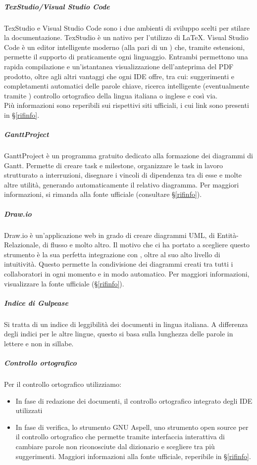 			\subparagraph{TexStudio/Visual Studio Code}
			TexStudio e Visual Studio Code sono i due ambienti di sviluppo scelti per stilare la documentazione.
			TexStudio è un  nativo per l'utilizzo di \LaTeX. Visual Studio Code è un editor intelligente moderno (alla pari di un ) che, tramite
			estensioni, permette il supporto di praticamente ogni linguaggio.
			Entrambi permettono una rapida compilazione e un'istantanea visualizzazione dell'anteprima del PDF prodotto, oltre agli altri vantaggi che ogni IDE offre,
			tra cui: suggerimenti e completamenti automatici delle parole chiave, ricerca intelligente (eventualmente tramite ) controllo ortografico della
			lingua italiana o inglese e così via.\\
			Più informazioni sono reperibili sui rispettivi siti ufficiali, i cui link sono presenti in \S\ref{rifinfo}.

			\subparagraph{GanttProject}
			GanttProject è un programma gratuito dedicato alla formazione dei diagrammi di Gantt. Permette di creare task e milestone, organizzare le task in lavoro
			strutturato a interruzioni, disegnare i vincoli di dipendenza tra di esse e molte altre utilità, generando automaticamente il relativo diagramma.
			Per maggiori informazioni, si rimanda alla fonte ufficiale (consultare \S\ref{rifinfo}).

			\subparagraph{Draw.io}\label{drawio}
			Draw.io è un'applicazione web in grado di creare diagrammi UML, di Entità-Relazionale, di flusso e molto altro. Il motivo che ci ha portato
			a scegliere questo strumento è la sua perfetta integrazione con , oltre al suo alto livello di intuitività.
			Questo permette la condivisione dei diagrammi creati tra tutti i collaboratori in ogni momento e in modo automatico.
			Per maggiori informazioni, visualizzare la fonte ufficiale (\S\ref{rifinfo}).

			\subparagraph{Indice di Gulpease}
			Si tratta di un indice di leggibilità dei documenti in lingua italiana. A differenza degli indici per le altre lingue, questo si basa sulla
			lunghezza delle parole in lettere e non in sillabe.

			\subparagraph{Controllo ortografico}
			Per il controllo ortografico utilizziamo:
			\begin{itemize}
				\item In fase di redazione dei documenti, il controllo ortografico integrato degli IDE utilizzati
				\item In fase di verifica, lo strumento GNU Aspell, uno strumento open source per il controllo ortografico che permette tramite interfaccia
					interattiva di cambiare parole non riconosciute dal dizionario e scegliere tra più suggerimenti. Maggiori informazioni alla fonte ufficiale,
					reperibile in \S\ref{rifinfo}.
				
			\end{itemize}

